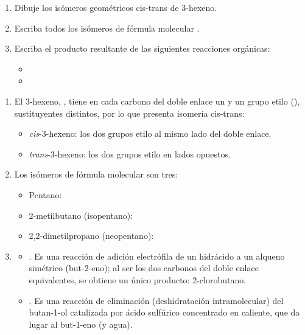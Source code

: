 \begin{exerciseEVAU}
    \begin{enumerate}[label=\letraminuscula]
        \item Dibuje los isómeros geométricos cis-trans de 3-hexeno.
        \item Escriba todos los isómeros de fórmula molecular .
        \item Escriba el producto resultante de las siguientes reacciones orgánicas:
        \begin{itemize}
            \item {}
            \item {}
        \end{itemize}

    \end{enumerate}
    \begin{solu}
        \begin{enumerate}[label=\letraminuscula]
            \item El 3-hexeno, , tiene en cada carbono del doble enlace un  y un grupo etilo (), sustituyentes distintos, por lo que presenta isomería cis-trans:
            \begin{itemize}
                \item \emph{cis}-3-hexeno: los dos grupos etilo al mismo lado del doble enlace.
                \item \emph{trans}-3-hexeno: los dos grupos etilo en lados opuestos.
            \end{itemize}

            \item Los isómeros de fórmula molecular  son tres:
            \begin{itemize}
                \item Pentano: 
                \item 2-metilbutano (isopentano): 
                \item 2,2-dimetilpropano (neopentano): 
            \end{itemize}

            \item
            \begin{itemize}
                \item {}. Es una reacción de adición electrófila de un hidrácido a un alqueno simétrico (but-2-eno); al ser los dos carbonos del doble enlace equivalentes, se obtiene un único producto: 2-clorobutano.

                \item {}. Es una reacción de eliminación (deshidratación intramolecular) del butan-1-ol catalizada por ácido sulfúrico concentrado en caliente, que da lugar al but-1-eno (y agua).
            \end{itemize}
        \end{enumerate}
    \end{solu}
\end{exerciseEVAU}



